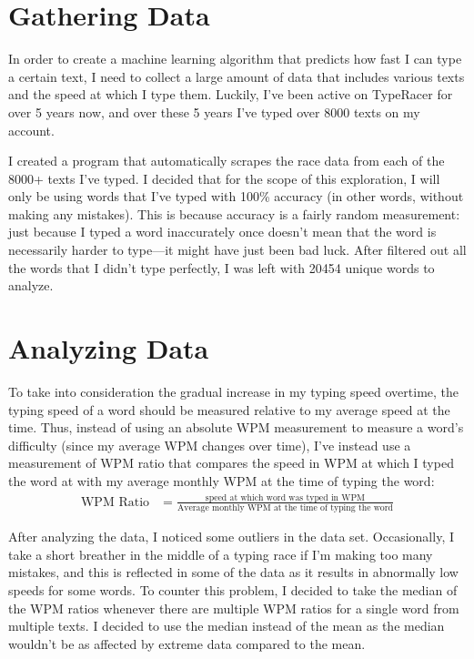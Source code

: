 \documentclass[12pt]{article}
\begin{document}
\section*{Gathering Data}

In order to create a machine learning algorithm that predicts how fast I can type a certain text, I need to collect a large amount of data that includes various texts and the speed at which I type them. Luckily, I've been active on TypeRacer for over 5 years now, and over these 5 years I've typed over 8000 texts on my account.

I created a program that automatically scrapes the race data from each of the 8000+ texts I've typed. I decided that for the scope of this exploration, I will only be using words that I've typed with 100\% accuracy (in other words, without making any mistakes). This is because accuracy is a fairly random measurement: just because I typed a word inaccurately once doesn't mean that the word is necessarily harder to type—it might have just been bad luck. After filtered out all the words that I didn't type perfectly, I was left with 20454 unique words to analyze.

\section*{Analyzing Data}

To take into consideration the gradual increase in my typing speed overtime, the typing speed of a word should be measured relative to my average speed at the time. Thus, instead of using an absolute WPM measurement to measure a word's difficulty (since my average WPM changes over time), I've instead use a measurement of WPM ratio that compares the speed in WPM at which I typed the word at with my average monthly WPM at the time of typing the word:
\begin{align*}
	\text{WPM Ratio} & = \frac{\text{speed at which word was typed in WPM}}{\text{Average monthly WPM at the time of typing the word}}
\end{align*}

After analyzing the data, I noticed some outliers in the data set. Occasionally, I take a short breather in the middle of a typing race if I'm making too many mistakes, and this is reflected in some of the data as it results in abnormally low speeds for some words. To counter this problem, I decided to take the median of the WPM ratios whenever there are multiple WPM ratios for a single word from multiple texts. I decided to use the median instead of the mean as the median wouldn't be as affected by extreme data compared to the mean.
\end{document}
